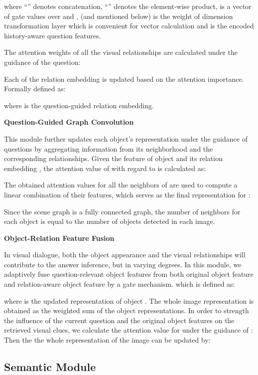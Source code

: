 \documentclass[letterpaper]{article} \usepackage{aaai20}  \usepackage{times}  \usepackage{helvet} \usepackage{courier}  \usepackage[hyphens]{url}  \usepackage{graphicx} \urlstyle{rm} \def\UrlFont{\rm}  \usepackage{graphicx}  \frenchspacing  \setlength{\pdfpagewidth}{8.5in}  \setlength{\pdfpageheight}{11in}  \usepackage{mathrsfs} \usepackage{amsfonts,amssymb}  \usepackage{tabularx} \usepackage{url}
\begin{document}
where ``'' denotes concatenation, ``'' denotes the element-wise product,  is a vector of  gate values over  and ,  (and  mentioned below) is the weight of dimension transformation layer which is convenient for vector calculation and  is the encoded history-aware question features.

The attention weights  of all the visual relationships are calculated under the guidance of the question:


Each of the relation embedding is updated based on the attention importance. Formally defined  as:

where  is the question-guided relation embedding.

\textbf{Question-Guided Graph Convolution}

This module further updates each object's representation under the guidance of questions by aggregating information from its neighborhood and the corresponding relationships. Given the feature  of object  and its relation embedding , the attention value of  with regard to  is calculated as:





The obtained attention values for all the neighbors of  are used to compute a linear combination of their features, which serves as the final representation  for :



Since the scene graph is a fully connected graph, the number of neighbors  for each object is equal to the number of objects detected in each image. 

\textbf{Object-Relation Feature Fusion}

In visual dialogue, both the object appearance and the visual relationships will contribute to the answer inference, but in varying degrees. In this module, we adaptively fuse question-relevant object features  from both original object feature  and relation-aware object feature  by a gate mechanism. 
which is defined as:


where  is the updated representation of object . The whole image representation  is obtained as the weighted sum of the object representations.  In order to strength the influence of the current question  and the original object features on the retrieved visual clues, we calculate the attention value  for  under the guidance of : 
Then the the whole representation of the image  can be updated by:



\subsection{Semantic Module}
\label{SemanticModule}
\end{document}
